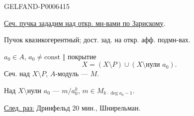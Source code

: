 \begin{GelfandAdjacentEvidence}{GELFAND-P000641}{5}


\underline{Сеч. пучка зададим над откр. мн-вами по Зарискому}.

Пучок квазикогерентный; дост. зад. на откр. афф. подмн-вах.

\(a_0\in A\), \(a_0\ne\mathrm{const}\) \(\Vert\) покрытие
\[
X=(X\setminus P)\cup(X\setminus\text{нули }a_0).
\]
Сеч. над \(X\setminus P\), \(A\)-модуль --- \(M\).

Над \(X\setminus\text{нули }a_0\) --- \(m/a_0^k\),
\(m\in M_{k\cdot\operatorname{deg}a_0-1}\).

\underline{След. раз:} Дринфельд \(20\) мин., Шнирельман.
\end{GelfandAdjacentEvidence}



